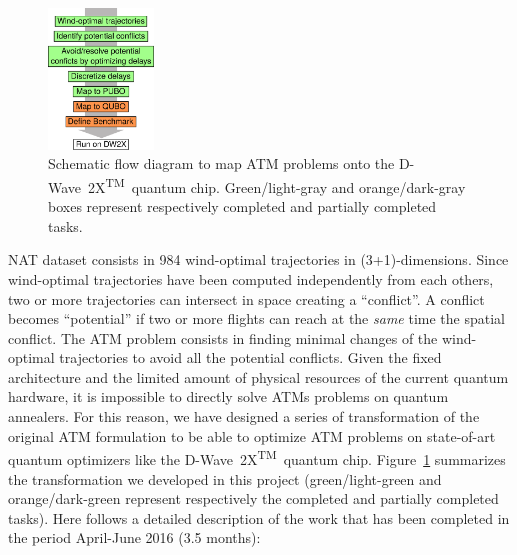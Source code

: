 \documentclass[9pt]{extarticle}
\renewcommand{\figurename}{Figure}
\newcommand{\DW}{\mbox{D-Wave 2X\textsuperscript{TM}}~}
\begin{document}
%
\begin{figure}
\centering
\includegraphics[width=0.25\textwidth]{scheme}
\caption{\label{fig:scheme}Schematic flow diagram to map ATM problems onto the \DW quantum chip. Green/light-gray and orange/dark-gray boxes represent
respectively completed and partially completed tasks.}
\end{figure}
%
NAT dataset consists in 984 wind-optimal trajectories in (3+1)-dimensions. Since wind-optimal
trajectories have been computed independently from each others, two or more trajectories can intersect in space creating a ``conflict''. 
A conflict becomes ``potential'' if two or more flights can reach at the \emph{same} time the spatial conflict. The ATM problem consists
in finding minimal changes of the wind-optimal trajectories to avoid all the potential conflicts. 
Given the fixed architecture and the limited amount of physical resources of the current quantum hardware, it is impossible to directly solve ATMs problems
on quantum annealers. For this reason, we have designed a series of transformation of the original ATM formulation 
to be able to optimize ATM problems on state-of-art quantum optimizers like the \DW quantum chip. \figurename~\ref{fig:scheme} summarizes the transformation 
we developed in this project (green/light-green and orange/dark-green represent respectively the completed and partially completed tasks).
Here follows a detailed description of the work that has been completed in the period April-June 2016 (3.5 months):
\end{document}
